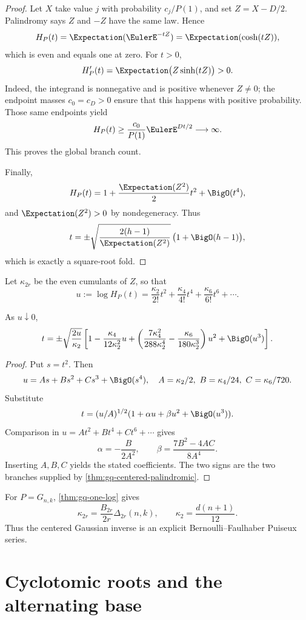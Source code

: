 \begin{proof}
Let \(X\) take value \(j\) with probability \(c_j/P(1)\), and set
\(Z=X-D/2\).  Palindromy says \(Z\) and \(-Z\) have the same law.  Hence
\[
  H_P(t)=\Expectation(\EulerE^{-tZ})=\Expectation(\cosh(tZ)),
\]
which is even and equals one at zero.  For \(t>0\),
\[
  H_P'(t)=\Expectation\bigl(Z\sinh(tZ)\bigr)>0.
\]
Indeed, the integrand is nonnegative and is positive whenever \(Z\ne0\);
the endpoint masses \(c_0=c_D>0\) ensure that this happens with positive
probability.  Those same endpoints yield
\[
  H_P(t)\ge\frac{c_0}{P(1)}\EulerE^{Dt/2}\longrightarrow\infty.
\]
This proves the global branch count.

Finally,
\[
  H_P(t)=1+\frac{\Expectation(Z^2)}2t^2+\BigO(t^4),
\]
and \(\Expectation(Z^2)>0\) by nondegeneracy.  Thus
\[
  t=\pm\sqrt{\frac{2(h-1)}{\Expectation(Z^2)}}\,
  \bigl(1+\BigO(h-1)\bigr),
\]
which is exactly a square-root fold.
\end{proof}

Let \(\kappa_{2r}\) be the even cumulants of \(Z\), so that
\[
  u:=\log H_P(t)
  =\frac{\kappa_2}{2!}t^2
   +\frac{\kappa_4}{4!}t^4
   +\frac{\kappa_6}{6!}t^6+\cdots.
\]

\begin{proposition}
\label{prop:gq-centered-puiseux}
As \(u\downarrow0\),
\[
  t=\pm\sqrt{\frac{2u}{\kappa_2}}
  \left[
    1-\frac{\kappa_4}{12\kappa_2^2}u
    +\left(
       \frac{7\kappa_4^2}{288\kappa_2^4}
       -\frac{\kappa_6}{180\kappa_2^3}
     \right)u^2
    +\BigO(u^3)
  \right].
\]
\end{proposition}

\begin{proof}
Put \(s=t^2\).  Then
\[
  u=As+Bs^2+Cs^3+\BigO(s^4),
  \quad
  A=\kappa_2/2,\ B=\kappa_4/24,\ C=\kappa_6/720.
\]
Substitute
\[
  t=(u/A)^{1/2}(1+\alpha u+\beta u^2+\BigO(u^3)).
\]
Comparison in \(u=At^2+Bt^4+Ct^6+\cdots\) gives
\[
  \alpha=-\frac{B}{2A^2},
  \qquad
  \beta=\frac{7B^2-4AC}{8A^4}.
\]
Inserting \(A,B,C\) yields the stated coefficients.  The two signs are the
two branches supplied by \cref{thm:gq-centered-palindromic}.
\end{proof}

For \(P=G_{n,k}\), \cref{thm:gq-one-log} gives
\[
  \kappa_{2r}
  =\frac{B_{2r}}{2r}\Delta_{2r}(n,k),
  \qquad
  \kappa_2=\frac{d(n+1)}{12}.
\]
Thus the centered Gaussian inverse is an explicit
Bernoulli--Faulhaber Puiseux series.

\section{Cyclotomic roots and the alternating base}
\label{sec:gaussian-cyclotomic}

